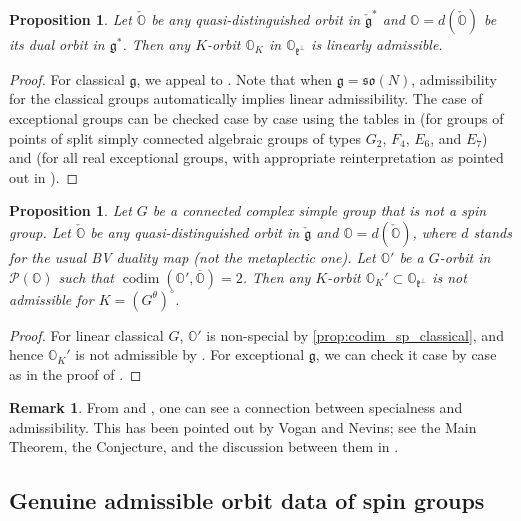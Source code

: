 \documentclass[11pt, a4paper]{amsart}
\newcommand{\g}{\mathfrak{g}}
\newcommand{\orb}{\mathbb{O}}
\newcommand{\orbk}{\orb_{K}}
\newcommand{\fg}{\mathfrak{g}}
\newcommand{\fk}{\mathfrak{k}}
\newcommand{\ckfg}{{\check{\fg}}}
\newcommand{\ckorb}{\check{\orb}}
\newcommand{\fso}{\mathfrak{so}}
\newcommand{\cP}{\mathcal{P}}
\DeclareMathOperator{\codim}{codim}
\newtheorem{Prop}[Thm]{Proposition}
\theoremstyle{definition}
\newtheorem{Rem}[Thm]{Remark}
\numberwithin{equation}{section}
\begin{document}
\begin{Prop}\label{prop:adm_dist}
	Let $\ckorb$ be any quasi-distinguished orbit in $\ckfg^*$ and $\orb = d(\ckorb)$ be its dual orbit in $\g^*$. Then any $K$-orbit $\orbk$ in $\orb_{\fk^\perp}$ is linearly admissible.
\end{Prop}

\begin{proof}
	For classical $\g$, we appeal to . Note that when $\g = \fso(N)$, admissibility for the classical groups automatically implies linear admissibility. The case of exceptional groups can be checked case by case using the tables in \cite{Nevins} (for groups of points of split simply connected algebraic groups of types $G_2$, $F_4$, $E_6$, and $E_7$) and \cite{Noel1, Noel2} (for all real exceptional groups, with appropriate reinterpretation as pointed out in \cite[Remark 8.5.4]{LY}). 
\end{proof}

\begin{Prop} \label{prop:non_adm_codim2}
	Let $G$ be a connected complex simple group that is not a spin group.
	Let $\ckorb$ be any quasi-distinguished orbit in $\ckfg$ and $\orb = d(\ckorb)$, where $d$ stands for the usual BV duality map (not the metaplectic one). Let $\orb'$ be a $G$-orbit in $\cP(\orb)$ such that $\codim(\orb', \overline{\orb}) = 2$. Then any $K$-orbit $\orbk' \subset \orb_{\fk^\perp}$ is not admissible for $K=(G^\theta)^\circ$.
\end{Prop}

\begin{proof}
	For linear classical $G$, $\orb'$ is non-special by \cref{prop:codim_sp_classical}, and hence $\orbk'$ is not admissible by . For exceptional $\g$, we can check it case by case as in the proof of .
\end{proof}

\begin{Rem}
	From  and , one can see a connection between specialness and admissibility. This has been pointed out by Vogan and Nevins; see the Main Theorem, the Conjecture, and the discussion between them in \cite{Nevins}.
\end{Rem}


\subsection{Genuine admissible orbit data of spin groups} \label{subsec:adm_spin_genuine}
\end{document}
